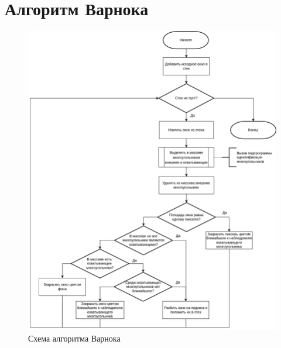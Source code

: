 \chapter{Алгоритм Варнока}
\label{cha:appendix2}

\begin{figure}[h]
	\centering
	\includegraphics[scale=0.1725 ]{img/flowchart/subdivide3.png}
	\caption{Схема алгоритма Варнока}
	\label{fig:warnock_algorithm}
\end{figure} 

